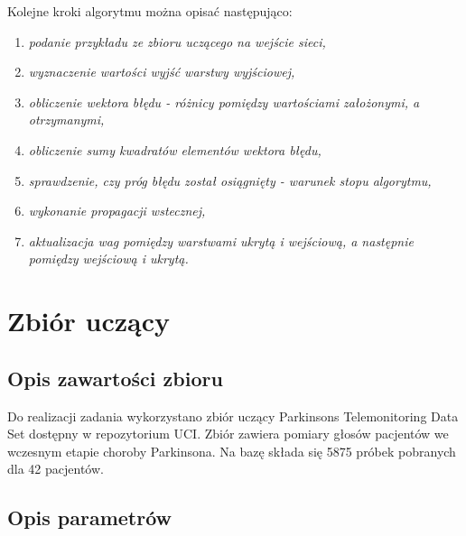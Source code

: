 \documentclass[12pt]{article}
\begin{document}
Kolejne kroki algorytmu można opisać następująco:

\begin{enumerate}

\item \textsl{podanie przykładu ze zbioru uczącego na wejście sieci,}

\item \textsl{wyznaczenie wartości wyjść warstwy wyjściowej,}

\item \textsl{obliczenie wektora błędu - różnicy pomiędzy wartościami założonymi, a otrzymanymi,}

\item \textsl{obliczenie sumy kwadratów elementów wektora błędu,}

\item \textsl{sprawdzenie, czy próg błędu został osiągnięty - warunek stopu algorytmu,}

\item \textsl{wykonanie propagacji wstecznej,}

\item \textsl{aktualizacja wag pomiędzy warstwami ukrytą i wejściową, a następnie pomiędzy wejściową i ukrytą.}

\end{enumerate}

\newpage
\section{Zbiór uczący}

\subsection{Opis zawartości zbioru}

Do realizacji zadania wykorzystano zbiór uczący Parkinsons Telemonitoring Data Set dostępny w repozytorium UCI. Zbiór zawiera pomiary głosów pacjentów we wczesnym etapie choroby Parkinsona. Na bazę składa się 5875 próbek pobranych dla 42 pacjentów.

\subsection{Opis parametrów}
\end{document}
